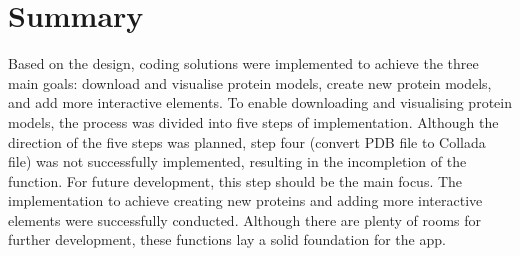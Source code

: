 \section{Summary}
Based on the design, coding solutions were implemented to achieve the three main goals: download and visualise protein models, create new protein models, and add more interactive elements. To enable downloading and visualising protein models, the process was divided into five steps of implementation. Although the direction of the five steps was planned, step four (convert PDB file to Collada file) was not successfully implemented, resulting in the incompletion of the function. For future development, this step should be the main focus. The implementation to achieve creating new proteins and adding more interactive elements were successfully conducted. Although there are plenty of rooms for further development, these functions lay a solid foundation for the app.
